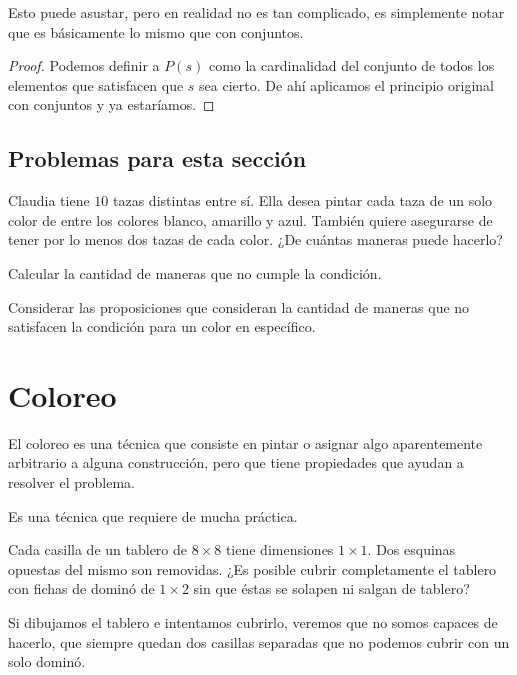 Esto puede asustar, pero en realidad no es tan complicado,
es simplemente notar que es básicamente lo mismo que
con conjuntos.

\begin{proof}
	Podemos definir a $P(s)$ como
	la cardinalidad del conjunto
	de todos los elementos que satisfacen que $s$
	sea cierto. De ahí aplicamos el principio
	original con conjuntos y ya estaríamos.
\end{proof}

\subsection*{Problemas para esta sección}
\begin{problem}[OMAPA 2025/5] %
\label{problem:omapa2025-5}
Claudia tiene $10$ tazas distintas entre sí. Ella desea pintar cada taza de un
solo color de entre los colores blanco, amarillo y azul. También quiere
asegurarse de tener por lo menos dos tazas de cada color. ¿De cuántas maneras
puede hacerlo?
\begin{hints}
	\begin{hint}
		Calcular la cantidad
		de maneras que no cumple la condición.
	\end{hint}
	\begin{hint}
		Considerar las proposiciones que consideran
		la cantidad de maneras que no satisfacen la
		condición para un color en específico.
	\end{hint}
\end{hints}
\end{problem}

\section{Coloreo}
El coloreo es una técnica que
consiste en pintar o asignar algo
aparentemente arbitrario a alguna
construcción, pero que tiene propiedades
que ayudan a resolver el problema.

Es una técnica que requiere de mucha práctica.

\begin{example}
	Cada casilla de un tablero
	de $8 \times 8$ tiene dimensiones $1 \times 1$.
	Dos esquinas opuestas del mismo
	son removidas. ¿Es
	posible cubrir completamente el tablero con
	fichas de dominó de $1 \times 2$ sin que éstas
	se solapen ni salgan de tablero?
\end{example}
Si dibujamos el tablero e intentamos
cubrirlo, veremos que no
somos capaces de hacerlo, que siempre
quedan dos casillas separadas que
no podemos cubrir con un solo dominó.

